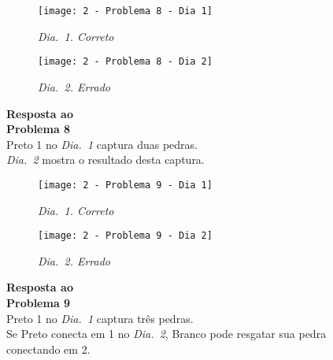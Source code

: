 \begin{SCfigure}[][h!]
    \begin{subfigure}[t]{.31\textwidth}
        \texttt{[image: 2 - Problema 8 - Dia 1]}
        \captionsetup{justification=centering}
        \caption*{\emph{Dia.\@~1. Correto}}
    \end{subfigure}
    \hfill
    \begin{subfigure}[t]{.31\textwidth}
        \texttt{[image: 2 - Problema 8 - Dia 2]}
        \captionsetup{justification=centering}
        \caption*{\emph{Dia.\@~2. Errado}}
    \end{subfigure}
    \hfill
    \caption*{\textbf{Resposta ao\\Problema 8}\\\vspace*{.25cm}Preto 1 no \emph{Dia.\@~1} captura duas pedras.\\\vspace*{.25cm}\emph{Dia.\@~2} mostra o resultado desta captura.}
\end{SCfigure}

\vfill

\begin{SCfigure}[][h!]
    \begin{subfigure}[t]{.31\textwidth}
        \texttt{[image: 2 - Problema 9 - Dia 1]}
        \captionsetup{justification=centering}
        \caption*{\emph{Dia.\@~1. Correto}}
    \end{subfigure}
    \hfill
    \begin{subfigure}[t]{.31\textwidth}
        \texttt{[image: 2 - Problema 9 - Dia 2]}
        \captionsetup{justification=centering}
        \caption*{\emph{Dia.\@~2. Errado}}
    \end{subfigure}
    \hfill
    \caption*{\textbf{Resposta ao\\Problema 9}\\\vspace*{.25cm}Preto 1 no \emph{Dia.\@~1} captura três pedras.\\\vspace*{.25cm}
    Se Preto conecta em 1 no \emph{Dia.\@~2}, Branco pode resgatar sua pedra conectando em 2.}
\end{SCfigure}

\pagebreak

